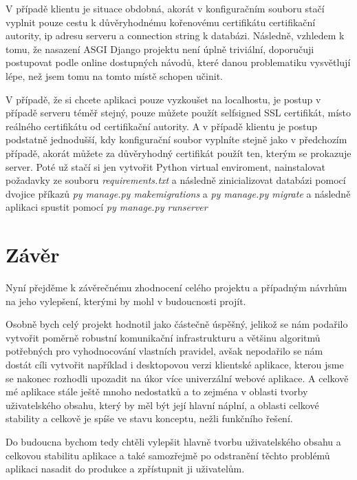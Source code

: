 \documentclass[12pt]{article}
\begin{document}
V případě klientu je situace obdobná, akorát v konfiguračním souboru stačí vyplnit pouze cestu k důvěryhodnému kořenovému certifikátu certifikační autority, ip adresu serveru a connection string k databázi. Následně, vzhledem k tomu, že nasazení ASGI Django projektu není úplně triviální, doporučuji postupovat podle online dostupných návodů, které danou problematiku vysvětlují lépe, než jsem tomu na tomto místě schopen učinit\cite{deployment}.

V případě, že si chcete aplikaci pouze vyzkoušet na localhostu, je postup v případě serveru téměř stejný, pouze můžete použít selfsigned SSL certifikát, místo reálného certifikátu od certifikační autority. A v případě klientu je postup podstatně jednodušší, kdy konfigurační soubor vyplníte stejně jako v předchozím případě, akorát můžete za důvěryhodný certifikát použít ten, kterým se prokazuje server. Poté už stačí si jen vytvořit Python virtual enviroment, nainstalovat požadavky ze souboru \textit{requirements.txt} a následně zinicializovat databázi pomocí dvojice příkazů \textit{py manage.py makemigrations} a \textit{py manage.py migrate} a následně aplikaci spustit pomocí \textit{py manage.py runserver}
\newpage
\section{Závěr}
Nyní přejděme k závěrečnému zhodnocení celého projektu a případným návrhům na jeho vylepšení, kterými by mohl v budoucnosti projít.

Osobně bych celý projekt hodnotil jako částečně úspěšný, jelikož se nám podařilo vytvořit poměrně robustní komunikační infrastrukturu a většinu algoritmů potřebných pro vyhodnocování vlastních pravidel, avšak nepodařilo se nám dostát cíli vytvořit například i desktopovou verzi klientské aplikace, kterou jsme se nakonec rozhodli upozadit na úkor více univerzální webové aplikace. A celkově mé aplikace stále ještě mnoho nedostatků a to zejména v oblasti tvorby uživatelského obsahu, který by měl být její hlavní náplní, a oblasti celkové stability a celkově je spíše ve stavu konceptu, nežli funkčního řešení.

Do budoucna bychom tedy chtěli vylepšit hlavně tvorbu uživatelského obsahu a celkovou stabilitu aplikace a také samozřejmě po odstranění těchto problémů aplikaci nasadit do produkce a zpřístupnit ji uživatelům.

\newpage
\printbibliography[heading=bibintoc,title={Reference}]
\newpage
{}
\listoflistings
\end{document}
